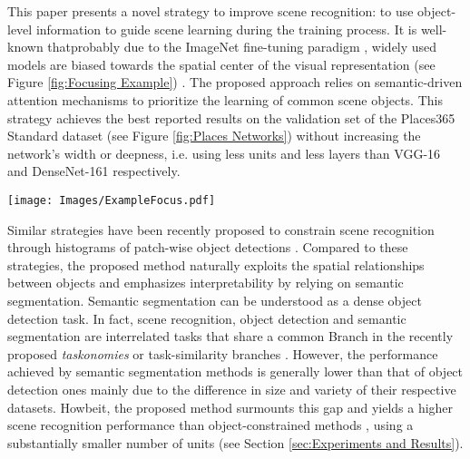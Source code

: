 \documentclass[review, 3p, sort&compress]{elsarticle}
\begin{document}
This paper presents a novel strategy to improve scene recognition: to use object-level information to guide scene learning during the training process. It is well-known that\textemdash probably due to the ImageNet fine-tuning paradigm \cite{he2018rethinking}, widely used models are biased towards the spatial center of the visual representation (see Figure \ref{fig:Focusing Example}) \cite{das2017human}. The proposed approach relies on semantic-driven attention mechanisms to prioritize the learning of common scene objects. This strategy achieves the best reported results on the validation set of the Places365 Standard dataset \cite{zhou2018places} (see Figure \ref{fig:Places Networks}) without increasing the network's width or deepness, i.e. using  less units and  less layers than VGG-16 and DenseNet-161 respectively.

\begin{figure*}[t!]
    \centering
    \texttt{[image: Images/ExampleFocus.pdf]}
    \caption{Scene recognition results depending on the input data. (a) RGB image corresponding to the "Kitchen" scene class. (b) Semantic segmentation from (a) obtained by a state-of-the-art CNN-based algorithm. (c) Class Activation Map (CAM) \cite{zhou2015cnnlocalization} just using the (a) RGB image. (d) CAM just using the (b) semantic segmentation. (e) CAM for the proposed approach, using both (a) and (b). Top@3 predicted classes are included in the top-left corner of images (c) to (e). Better viewed in color.}
    \label{fig:Focusing Example}
\end{figure*}

Similar strategies have been recently proposed to constrain scene recognition through histograms of patch-wise object detections \cite{wang2017weakly,cheng2018scene, jiang2019deep}. Compared to these strategies, the proposed method naturally exploits the spatial relationships between objects and emphasizes interpretability by relying on semantic segmentation. Semantic segmentation can be understood as a dense object detection task. In fact, scene recognition, object detection and semantic segmentation are interrelated tasks that share a common Branch in the recently proposed \textit{taskonomies} or task-similarity branches \cite{zamir2018taskonomy}.  However, the performance achieved by semantic segmentation methods is generally lower than that of object detection ones mainly due to the difference in size and variety of their respective datasets. Howbeit, the proposed method surmounts this gap and yields a higher scene recognition performance than object-constrained methods \cite{wang2017weakly,cheng2018scene}, using a substantially smaller number of units (see Section \ref{sec:Experiments and Results}).
\end{document}
